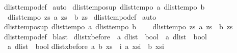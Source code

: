 \begin{isabellebody}
%
\isadelimproof
%
\endisadelimproof
%
\isatagproof
{}\isamarkupfalse%
\ dlist{\isacharunderscore}tempo{}{\isacharunderscore}def\isanewline
{}\isamarkupfalse%
\ auto%
\endisatagproof
{\isafoldproof}%
%
\isadelimproof
\isanewline
%
\endisadelimproof
\isanewline
{}\isamarkupfalse%
\ dlist{\isacharunderscore}tempo{}{\isacharunderscore}sup{\isacharcolon}\ {\isachardoublequoteopen}{\isasymlbrakk}dlist{\isacharunderscore}tempo{}\ a{\isacharsemicolon}\ dlist{\isacharunderscore}tempo{}\ b{\isasymrbrakk}\ {\isasymLongrightarrow}\ \isanewline
\ \ dlist{\isacharunderscore}tempo{}\ {\isacharparenleft}{\isasymlambda}zs{\isachardot}\ a\ zs\ {\isasymor}\ b\ zs{\isacharparenright}{\isachardoublequoteclose}\isanewline
%
\isadelimproof
%
\endisadelimproof
%
\isatagproof
{}\isamarkupfalse%
\ dlist{\isacharunderscore}tempo{}{\isacharunderscore}def\isanewline
{}\isamarkupfalse%
\ auto%
\endisatagproof
{\isafoldproof}%
%
\isadelimproof
\isanewline
%
\endisadelimproof
\isanewline
{}\isamarkupfalse%
\ dlist{\isacharunderscore}tempo{}{\isacharunderscore}sup{\isacharcolon}\ {\isachardoublequoteopen}{\isasymlbrakk}dlist{\isacharunderscore}tempo{}\ a{\isacharsemicolon}\ dlist{\isacharunderscore}tempo{}\ b{\isasymrbrakk}\ {\isasymLongrightarrow}\ \isanewline
\ \ dlist{\isacharunderscore}tempo{}\ {\isacharparenleft}{\isasymlambda}zs{\isachardot}\ a\ zs\ {\isasymor}\ b\ zs{\isacharparenright}{\isachardoublequoteclose}\isanewline
%
\isadelimproof
%
\endisadelimproof
%
\isatagproof
{}\isamarkupfalse%
\ dlist{\isacharunderscore}tempo{}{\isacharunderscore}def\isanewline
{}\isamarkupfalse%
\ blast%
\endisatagproof
{\isafoldproof}%
%
\isadelimproof
%
\endisadelimproof
%
\isamarkuptrue%
\isamarkupfalse%
\ dlist{\isacharunderscore}xbefore\ {\isacharcolon}{\isacharcolon}\ {\isachardoublequoteopen}{\isacharparenleft}{\isacharprime}a\ dlist\ {\isasymRightarrow}\ bool{\isacharparenright}\ {\isasymRightarrow}\ {\isacharparenleft}{\isacharprime}a\ dlist\ {\isasymRightarrow}\ bool{\isacharparenright}\ {\isasymRightarrow}\ \isanewline
\ \ {\isacharprime}a\ dlist\ {\isasymRightarrow}\ bool{\isachardoublequoteclose}\isanewline
{}\isanewline
{\isachardoublequoteopen}dlist{\isacharunderscore}xbefore\ a\ b\ xs\ {\isasymequiv}\ {\isasymexists}i{\isachardot}\ a\ {\isacharparenleft}xs{\isasymdagger}{\isachardot}{\isachardot}i{\isacharparenright}\ {\isasymand}\ b\ {\isacharparenleft}xs{\isasymdagger}i{\isachardot}{\isachardot}{\isacharparenright}{\isachardoublequoteclose}%

\end{isabellebody}
